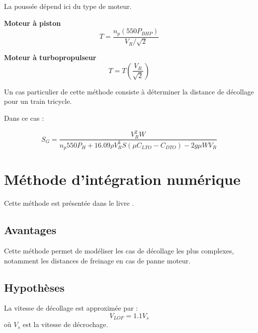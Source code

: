 				La poussée dépend ici du type de moteur.
				
				\vspace{0.3cm}
				
				\textbf{Moteur à piston}				\[ T= 	\frac{n_p(550P_{BHP})	}{	V_R/\sqrt{2}	}	\]
			
				\textbf{Moteur à turbopropulseur}		\[	T=T\left(\frac{V_R}{\sqrt{2}}\right)	\]
			
				\vspace{0.3cm}
				
				Un cas particulier de cette méthode consiste à déterminer la distance de décollage pour un train tricycle.
				
				Dans ce cas :
				
				\begin{equation*}
					S_G=	\frac{	V_R^2 W	}{	n_p 550 P_H		+	16.09\rho V_R^3 S 	(\mu C_{LTO}-C_{DTO})	-	2g\mu W V_R		}
				\end{equation*}
			
		\section{  Méthode d’intégration numérique}
			Cette méthode est présentée dans le livre \cite{smi:60}.
		
			\subsection{Avantages}
			
				Cette méthode permet de modéliser les cas de décollage les plus complexes, notamment les distances de freinage en cas de panne moteur.
			
			\vspace{0.3cm}
			
			\subsection{Hypothèses}
			
			La vitesse de décollage est approximée par :	\[	V_{LOF}=1.1V_s	\]	où $V_s$ est la vitesse de décrochage.
			
			\vspace{0.3cm}
			
	
			
